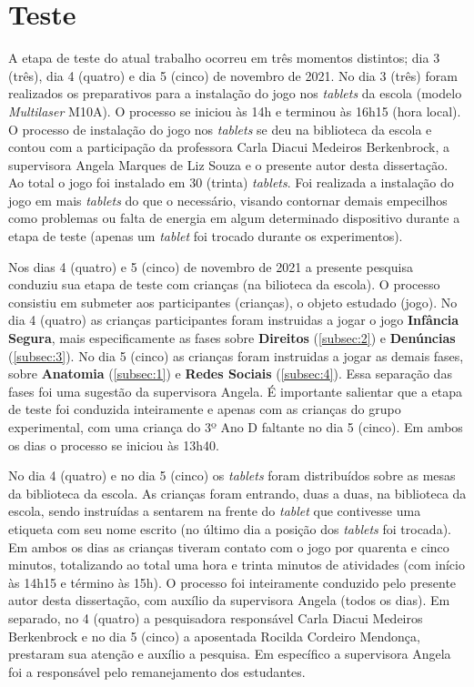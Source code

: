 \section{Teste}\label{sec:tes}

A etapa de teste do atual trabalho ocorreu em três momentos distintos; dia 3 (três), dia 4 (quatro) e dia 5 (cinco) de novembro de 2021. No dia 3 (três) foram realizados os preparativos para a instalação do jogo nos \textit{tablets} da escola (modelo \textit{Multilaser} M10A). O processo se iniciou às 14h e terminou às 16h15 (hora local). O processo de instalação do jogo nos \textit{tablets} se deu na biblioteca da escola e contou com a participação da professora Carla Diacui Medeiros Berkenbrock, a supervisora Angela Marques de Liz Souza e o presente autor desta dissertação. Ao total o jogo foi instalado em 30 (trinta) \textit{tablets}. Foi realizada a instalação do jogo em mais \textit{tablets} do que o necessário, visando contornar demais empecilhos como problemas ou falta de energia em algum determinado dispositivo durante a etapa de teste (apenas um \textit{tablet} foi trocado durante os experimentos). %

Nos dias 4 (quatro) e 5 (cinco) de novembro de 2021 a presente pesquisa conduziu sua etapa de teste com crianças (na bilioteca da escola). O processo consistiu em submeter aos participantes (crianças), o objeto estudado (jogo). No dia 4 (quatro) as crianças participantes foram instruidas a jogar o jogo \textbf{Infância Segura}, mais especificamente as fases sobre \textbf{Direitos} (\autoref{subsec:2}) e \textbf{Denúncias} (\autoref{subsec:3}). No dia 5 (cinco) as crianças foram instruidas a jogar as demais fases, sobre \textbf{Anatomia} (\autoref{subsec:1}) e \textbf{Redes Sociais} (\autoref{subsec:4}). Essa separação das fases foi uma sugestão da supervisora Angela. É importante salientar que a etapa de teste foi conduzida inteiramente e apenas com as crianças do grupo experimental, com uma criança do 3º Ano D faltante no dia 5 (cinco). Em ambos os dias o processo se iniciou às 13h40.

No dia 4 (quatro) e no dia 5 (cinco) os \textit{tablets} foram distribuídos sobre as mesas da biblioteca da escola. As crianças foram entrando, duas a duas, na biblioteca da escola, sendo instruídas a sentarem na frente do \textit{tablet} que contivesse uma etiqueta com seu nome escrito (no último dia a posição dos \textit{tablets} foi trocada). Em ambos os dias as crianças tiveram contato com o jogo por quarenta e cinco minutos, totalizando ao total uma hora e trinta minutos de atividades (com início às 14h15 e término às 15h). O processo foi inteiramente conduzido pelo presente autor desta dissertação, com auxílio da supervisora Angela (todos os dias). Em separado, no 4 (quatro) a pesquisadora responsável Carla Diacui Medeiros Berkenbrock e no dia 5 (cinco) a aposentada Rocilda Cordeiro Mendonça, prestaram sua atenção e auxílio a pesquisa. Em específico a supervisora Angela foi a responsável pelo remanejamento dos estudantes. %

